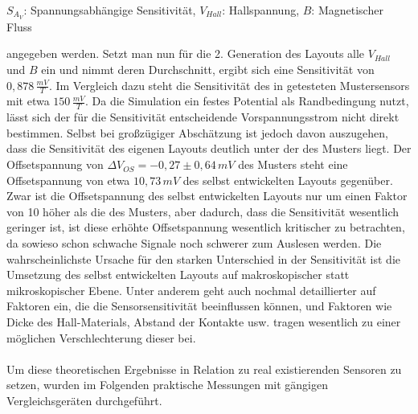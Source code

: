 \documentclass[12pt, a4paper]{article}
\renewcommand{\footnotesize}{\fontsize{10pt}{12pt}\selectfont}
\begin{document}
\vspace{-0.8em}
\begin{center}
	\footnotesize
	$S_{A_V}$: Spannungsabhängige Sensitivität, $V_{Hall}$: Hallspannung, $B$: Magnetischer Fluss
\end{center}
angegeben werden. Setzt man nun für die 2. Generation des Layouts alle $V _{Hall}$ und $B$ ein und nimmt deren Durchschnitt, ergibt sich eine Sensitivität von $0,878\,\frac{mV}{T}$. Im Vergleich dazu steht die Sensitivität des in \cite{cres20} getesteten Mustersensors mit etwa $150\,\frac{mV}{T}$. Da die Simulation ein festes Potential als Randbedingung nutzt, lässt sich der für die Sensitivität entscheidende Vorspannungsstrom nicht direkt bestimmen. Selbst bei großzügiger Abschätzung ist jedoch davon auszugehen, dass die Sensitivität des eigenen Layouts deutlich unter der des Musters liegt.\newline
Der Offsetspannung von $\Delta{V_{OS}}=-0,27\pm0,64\,mV$ des Musters steht eine Offsetspannung von etwa $10,73\,mV$ des selbst entwickelten Layouts gegenüber.\newline
Zwar ist die Offsetspannung des selbst entwickelten Layouts nur um einen Faktor von 10 höher als die des Musters, aber dadurch, dass die Sensitivität wesentlich geringer ist, ist diese erhöhte Offsetspannung wesentlich kritischer zu betrachten, da sowieso schon schwache Signale noch schwerer zum Auslesen werden.\newline
Die wahrscheinlichste Ursache für den starken Unterschied in der Sensitivität ist die Umsetzung des selbst entwickelten Layouts auf makroskopischer statt mikroskopischer Ebene. Unter anderem \cite{heidari15} geht auch nochmal detaillierter auf Faktoren ein, die die Sensorsensitivität beeinflussen können, und Faktoren wie Dicke des Hall-Materials, Abstand der Kontakte usw. tragen wesentlich zu einer möglichen Verschlechterung dieser bei.\paragraph{}

Um diese theoretischen Ergebnisse in Relation zu real existierenden Sensoren zu setzen, wurden im Folgenden praktische Messungen mit gängigen Vergleichsgeräten durchgeführt.\paragraph{}
\end{document}
